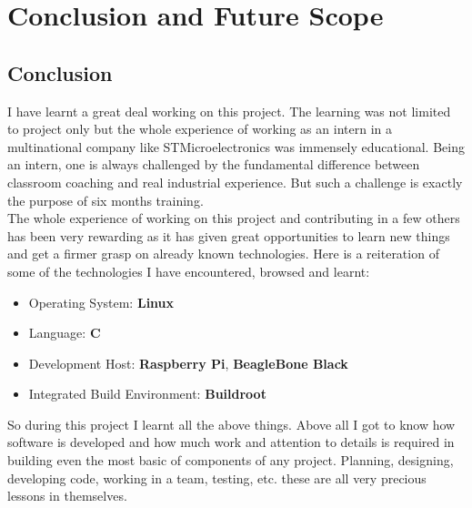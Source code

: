 \chapter{Conclusion and Future Scope}
\section{Conclusion}
I have learnt a great deal working on this project. The learning was not limited to project only but the whole experience of working as an intern in a multinational company like STMicroelectronics was immensely educational. Being an intern, one is always challenged by the fundamental difference between classroom coaching and real industrial experience. But such a challenge is exactly the purpose of six months training.\\
The whole experience of working on this project and contributing in a few others has been very rewarding as it has given great opportunities to learn new things and get a firmer grasp on already known technologies. Here is a reiteration of some of the technologies I have encountered, browsed and learnt:
\begin{itemize}
	\item Operating System: \textbf{Linux}
	\item Language: \textbf{C}
	\item Development Host: \textbf{Raspberry Pi}, \textbf{BeagleBone Black}
	\item Integrated Build Environment: \textbf{Buildroot}
\end{itemize}
So during this project I learnt all the above things. Above all I got to know how software is developed and how much work and attention to details is required in building even the most basic of components of any project. Planning, designing, developing code, working in a team, testing, etc. these are all very precious lessons in themselves. 
